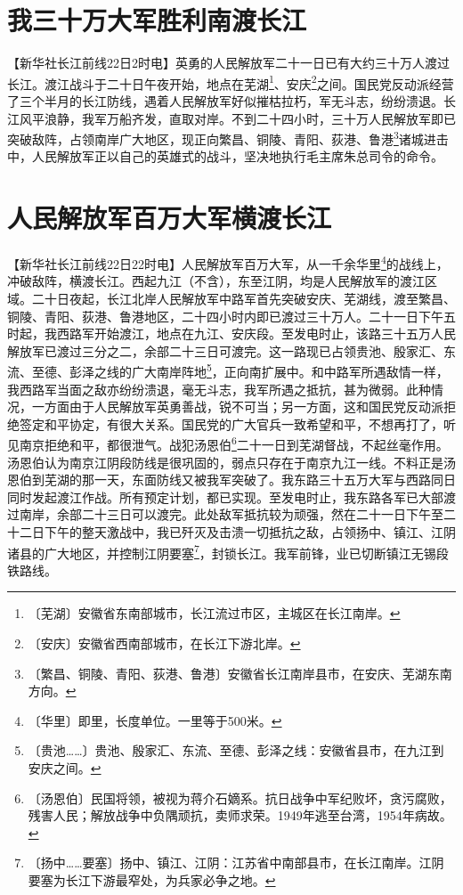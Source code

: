 \documentclass[12pt,UTF-8,openany]{ctexbook}
\begin{document}
\begin{large}
    
    \section{我三十万大军胜利南渡长江}
    
    【新华社长江前线22日2时电】英勇的人民解放军二十一日已有大约三十万人渡过长江。渡江战斗于二十日午夜开始，地点在芜湖\footnote{〔芜湖〕安徽省东南部城市，长江流过市区，主城区在长江南岸。}、安庆\footnote{〔安庆〕安徽省西南部城市，在长江下游北岸。}之间。国民党反动派经营了三个半月的长江防线，遇着人民解放军好似摧枯拉朽，军无斗志，纷纷溃退。长江风平浪静，我军万船齐发，直取对岸。不到二十四小时，三十万人民解放军即已突破敌阵，占领南岸广大地区，现正向繁昌、铜陵、青阳、荻港、鲁港\footnote{〔繁昌、铜陵、青阳、荻港、鲁港〕安徽省长江南岸县市，在安庆、芜湖东南方向。}诸城进击中，人民解放军正以自己的英雄式的战斗，坚决地执行毛主席朱总司令的命令。
    
    \section{人民解放军百万大军横渡长江}
    
    【新华社长江前线22日22时电】人民解放军百万大军，从一千余华里\footnote{〔华里〕即里，长度单位。一里等于500米。}的战线上，冲破敌阵，横渡长江。西起九江（不含），东至江阴，均是人民解放军的渡江区域。二十日夜起，长江北岸人民解放军中路军首先突破安庆、芜湖线，渡至繁昌、铜陵、青阳、荻港、鲁港地区，二十四小时内即已渡过三十万人。二十一日下午五时起，我西路军开始渡江，地点在九江、安庆段。至发电时止，该路三十五万人民解放军已渡过三分之二，余部二十三日可渡完。这一路现已占领贵池、殷家汇、东流、至德、彭泽之线的广大南岸阵地\footnote{〔贵池……〕贵池、殷家汇、东流、至德、彭泽之线：安徽省县市，在九江到安庆之间。}，正向南扩展中。和中路军所遇敌情一样，我西路军当面之敌亦纷纷溃退，毫无斗志，我军所遇之抵抗，甚为微弱。此种情况，一方面由于人民解放军英勇善战，锐不可当；另一方面，这和国民党反动派拒绝签定和平协定，有很大关系。国民党的广大官兵一致希望和平，不想再打了，听见南京拒绝和平，都很泄气。战犯汤恩伯\footnote{〔汤恩伯〕民国将领，被视为蒋介石嫡系。抗日战争中军纪败坏，贪污腐败，残害人民；解放战争中负隅顽抗，卖师求荣。1949年逃至台湾，1954年病故。}二十一日到芜湖督战，不起丝毫作用。汤恩伯认为南京江阴段防线是很巩固的，弱点只存在于南京九江一线。不料正是汤恩伯到芜湖的那一天，东面防线又被我军突破了。我东路三十五万大军与西路同日同时发起渡江作战。所有预定计划，都已实现。至发电时止，我东路各军已大部渡过南岸，余部二十三日可以渡完。此处敌军抵抗较为顽强，然在二十一日下午至二十二日下午的整天激战中，我已歼灭及击溃一切抵抗之敌，占领扬中、镇江、江阴诸县的广大地区，并控制江阴要塞\footnote{〔扬中……要塞〕扬中、镇江、江阴：江苏省中南部县市，在长江南岸。江阴要塞为长江下游最窄处，为兵家必争之地。}，封锁长江。我军前锋，业已切断镇江无锡段铁路线。
    
\end{large}
\end{document}
